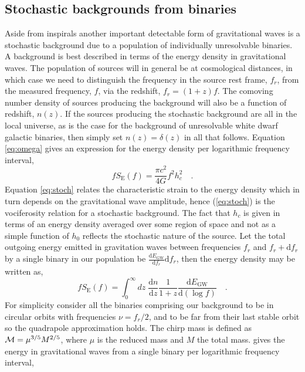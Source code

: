 \subsection{Stochastic backgrounds from binaries}
Aside from inspirals another important detectable form of gravitational waves is a stochastic background due to a population of individually unresolvable binaries. A background is best described in terms of the energy density in gravitational waves. The population of sources will in general be at cosmological distances, in which case we need to distinguish the frequency in the source rest frame, $f_{r}$, from the measured frequency, $f$, via the redshift, $f_{r}=(1+z)f$. The comoving number density of sources producing the background will also be a function of redshift, $n(z)$. If the sources producing the stochastic background are all in the local universe, as is the case for the background of unresolvable white dwarf galactic binaries, then simply set $n(z)=\delta (z)$ in all that follows. Equation \ref{eq:omega} gives an expression for the energy density per logarithmic frequency interval,
\begin{equation}\label{eq:stoch} fS_{\textrm{E}}(f)=\frac{\pi c^{2}}{4G}f^{2}h_{c}^{2} \quad . \end{equation}
Equation \ref{eq:stoch} relates the characteristic strain to the energy density which in turn depends on the gravitational wave amplitude, hence (\ref{eq:stoch}) is the vociferosity relation for a stochastic background. The fact that $h_{c}$ is given in terms of an energy density averaged over some region of space and not as a simple function of $h_{0}$ reflects the stochastic nature of the source. Let the total outgoing energy emitted in gravitation waves between frequencies $f_{r}$ and $f_{r}+\textrm{d}f_{r}$ by a single binary in our population be $\frac{\textrm{d}E_{\textrm{GW}}}{\textrm{d}f_{r}}\textrm{d}f_{r}$, then the energy density may be written as,
\begin{equation}\label{eq:Phinney} fS_{\textrm{E}}(f)=\int_{0}^{\infty}dz\; \frac{\textrm{d}n}{\textrm{d}z}\frac{1}{1+z}\frac{\textrm{d}E_{\textrm{GW}}}{\textrm{d}\left(\log f\right)} \quad . \end{equation}
For simplicity consider all the binaries comprising our background to be in circular orbits with frequencies $\nu=f_{r}/2$, and to be far from their last stable orbit so the quadrapole approximation holds. The chirp mass is defined as ${\cal{M}}=\mu^{3/5}M^{2/5}$, where $\mu$ is the reduced mass and $M$ the total mass. \cite{Thorne} gives the energy in gravitational waves from a single binary per logarithmic frequency interval,
